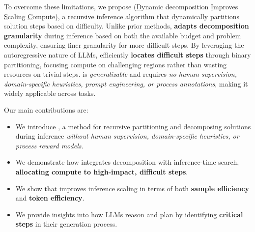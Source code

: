 To overcome these limitations, we propose \decomp (\underline{D}ynamic decomposition \underline{I}mproves \underline{S}caling \underline{C}ompute), a recursive inference algorithm that dynamically partitions solution steps based on difficulty. Unlike prior methods, \decomp \textbf{adapts decomposition granularity} during inference based on both the available budget and problem complexity, ensuring finer granularity for more difficult steps. By leveraging the autoregressive nature of LLMs, \decomp efficiently \textbf{locates difficult steps} through binary partitioning, focusing compute on challenging regions rather than wasting resources on trivial steps. \decomp is \emph{generalizable} and requires \emph{no human supervision, domain-specific heuristics, prompt engineering, or process annotations}, making it widely applicable across tasks.

Our main contributions are:
\vspace{-0.1in}
\begin{itemize}[leftmargin=*,itemsep=0pt,topsep=0pt,parsep=0.4pt, partopsep=0pt]%
    \item We introduce \decomp, a method for recursive partitioning and decomposing solutions during inference \emph{without human supervision, domain-specific heuristics, or process reward models}.
    \item We demonstrate how \decomp integrates decomposition with inference-time search, \textbf{allocating compute to high-impact, difficult steps}.
    \item We show that \decomp improves inference scaling in terms of both \textbf{sample efficiency} and \textbf{token efficiency}.
    \item We provide insights into how LLMs reason and plan by identifying \textbf{critical steps} in their generation process.
\end{itemize}





